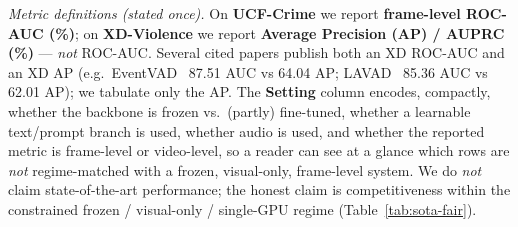 \noindent\textit{Metric definitions (stated once).}
On \textbf{UCF-Crime} we report \textbf{frame-level ROC-AUC (\%)}; on
\textbf{XD-Violence} we report \textbf{Average Precision (AP) / AUPRC (\%)}
--- \emph{not} ROC-AUC. Several cited papers publish both an XD ROC-AUC and an
XD AP (e.g.\ EventVAD~\cite{shao2025eventvad} 87.51 AUC vs 64.04 AP;
LAVAD~\cite{zanella2024lavad} 85.36 AUC vs 62.01 AP); we
tabulate only the AP. The \textbf{Setting} column encodes, compactly, whether
the backbone is frozen vs.\ (partly) fine-tuned, whether a learnable text/prompt
branch is used, whether audio is used, and whether the reported metric is
frame-level or video-level, so a reader can see at a glance which rows are
\emph{not} regime-matched with a frozen, visual-only, frame-level system.
We do \emph{not} claim state-of-the-art performance; the honest claim is
competitiveness within the constrained frozen / visual-only / single-GPU regime
(Table~\ref{tab:sota-fair}).

